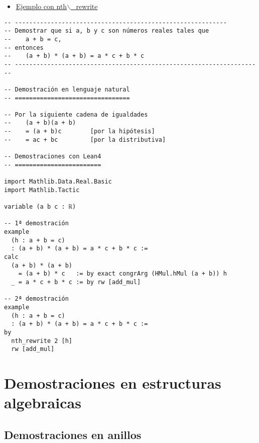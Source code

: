 \begin{itemize}
\item \href{./src/Basicos/Ejemplo\_con\_nth\_rewrite.lean}{Ejemplo con nth$\backslash$\_rewrite}
\end{itemize}
\begin{verbatim}
-- -----------------------------------------------------------
-- Demostrar que si a, b y c son números reales tales que
--    a + b = c,
-- entonces
--    (a + b) * (a + b) = a * c + b * c
-- ---------------------------------------------------------------------

-- Demostración en lenguaje natural
-- ================================

-- Por la siguiente cadena de igualdades
--    (a + b)(a + b)
--    = (a + b)c        [por la hipótesis]
--    = ac + bc         [por la distributiva]

-- Demostraciones con Lean4
-- ========================

import Mathlib.Data.Real.Basic
import Mathlib.Tactic

variable (a b c : ℝ)

-- 1ª demostración
example
  (h : a + b = c)
  : (a + b) * (a + b) = a * c + b * c :=
calc
  (a + b) * (a + b)
    = (a + b) * c   := by exact congrArg (HMul.hMul (a + b)) h
  _ = a * c + b * c := by rw [add_mul]

-- 2ª demostración
example
  (h : a + b = c)
  : (a + b) * (a + b) = a * c + b * c :=
by
  nth_rewrite 2 [h]
  rw [add_mul]
\end{verbatim}

\section{Demostraciones en estructuras algebraicas}
\label{sec:org4a55134}

\subsection{Demostraciones en anillos}
\label{sec:orgc8a837d}

